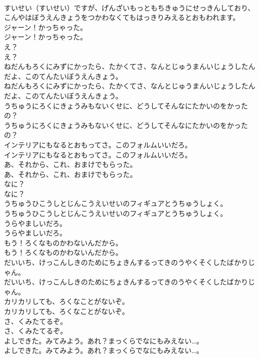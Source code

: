 \documentclass[8pt]{extreport}
\begin{document}
\begin{CJK}{UTF8}{min}
\\	すいせい（すいせい）ですが、げんざいもっともちきゅうにせっきんしており、こんやはぼうえんきょうをつかわなくてもはっきりみえるとおもわれます。 
\\	ジャーン！かっちゃった。	
\\	ジャーン！かっちゃった。 
\\	え？	
\\	え？ 
\\	ねだんもろくにみずにかったら、たかくてさ、なんとじゅうまんいじょうしたんだよ、このてんたいぼうえんきょう。	
\\	ねだんもろくにみずにかったら、たかくてさ、なんとじゅうまんいじょうしたんだよ、このてんたいぼうえんきょう。 
\\	うちゅうにろくにきょうみもないくせに、どうしてそんなにたかいのをかったの？	
\\	うちゅうにろくにきょうみもないくせに、どうしてそんなにたかいのをかったの？ 
\\	インテリアにもなるとおもってさ。このフォルムいいだろ。	
\\	インテリアにもなるとおもってさ。このフォルムいいだろ。 
\\	あ、それから、これ、おまけでもらった。	
\\	あ、それから、これ、おまけでもらった。 
\\	なに？	
\\	なに？ 
\\	うちゅうひこうしとじんこうえいせいのフィギュアとうちゅうしょく。	
\\	うちゅうひこうしとじんこうえいせいのフィギュアとうちゅうしょく。 
\\	うらやましいだろ。	
\\	うらやましいだろ。 
\\	もう！ろくなものかわないんだから。	
\\	もう！ろくなものかわないんだから。 
\\	だいいち、けっこんしきのためにちょきんするってきのうやくそくしたばかりじゃん。	
\\	だいいち、けっこんしきのためにちょきんするってきのうやくそくしたばかりじゃん。 
\\	カリカリしても、ろくなことがないぞ。	
\\	カリカリしても、ろくなことがないぞ。 
\\	さ、くみたてるぞ。
\\	さ、くみたてるぞ。
\\	よしできた。みてみよう。あれ？まっくらでなにもみえない…。	
\\	よしできた。みてみよう。あれ？まっくらでなにもみえない…。 

\end{CJK}
\end{document}
